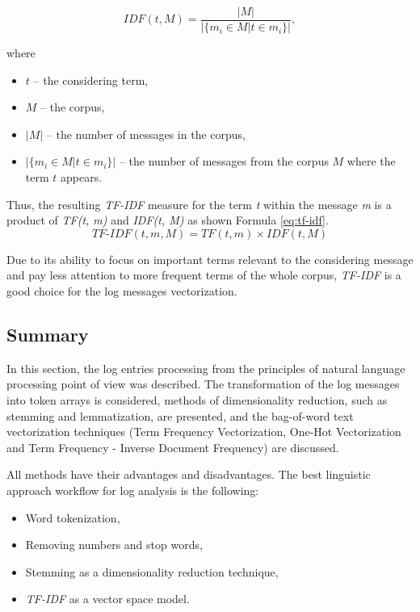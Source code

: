\documentclass[thesis=M,english]{FITthesis}[2019/12/23]
\begin{document}
\begin{equation}\label{eq:idf}
	IDF(t, M) = \frac{|M|}{|\{m_i \in M | t \in m_i\}|},
\end{equation}

where 
\begin{itemize}
	\item \(t\) -- the considering term,
	\item \(M\) -- the corpus,
	\item \(|M|\) -- the number of messages in the corpus,
	\item \(|\{m_i \in M | t \in m_i\}|\) -- the number of messages from the corpus \(M\) where the term \(t\)  appears.
\end{itemize}

Thus, the resulting \textit{TF-IDF} measure for the term \textit{t} within the message \textit{m} is a product of \textit{TF(t, m)} and \textit{IDF(t, M)} as shown Formula \ref{eq:tf-idf}\cite{tf-idf-def}.
\begin{equation}\label{eq:tf-idf}
	\textit{TF-IDF}(t, m, M) = TF(t, m) \times IDF(t, M)
\end{equation}

Due to its ability to focus on important terms relevant to the considering message and pay less attention to more frequent terms of the whole corpus, \textit{TF-IDF} is a good choice for the log messages vectorization.

\subsection{Summary}
In this section, the log entries processing from the principles of natural language processing point of view was described. The transformation of the log messages into token arrays is considered, methods of dimensionality reduction, such as stemming and lemmatization, are presented, and the bag-of-word text vectorization techniques (Term Frequency Vectorization, One-Hot Vectorization and Term Frequency - Inverse Document Frequency) are discussed.

All methods have their advantages and disadvantages. The best linguistic approach workflow for log analysis is the following:
\begin{itemize}
	\item Word tokenization,
	\item Removing numbers and stop words,
	\item Stemming as a dimensionality reduction technique,
	\item \textit{TF-IDF} as a vector space model.
\end{itemize}
\end{document}

